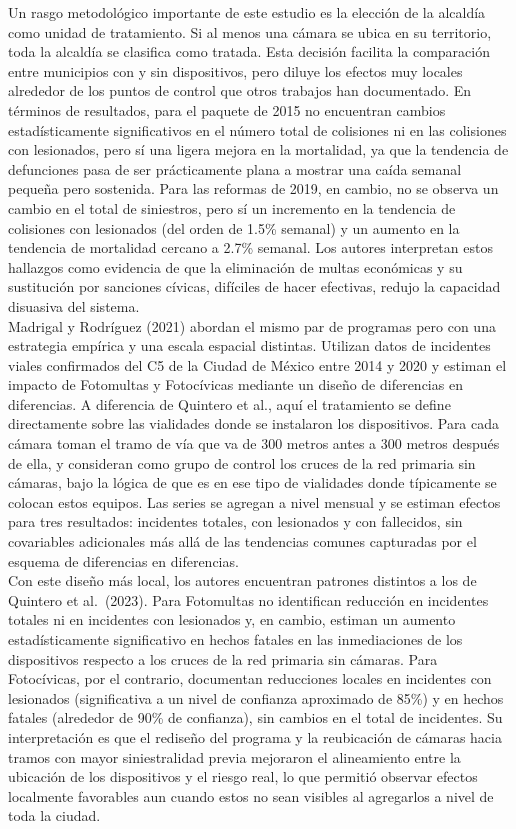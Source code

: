 Un rasgo metodológico importante de este estudio es la elección de la alcaldía como unidad de tratamiento. Si al menos una cámara se ubica en su territorio, toda la alcaldía se clasifica como tratada. Esta decisión facilita la comparación entre municipios con y sin dispositivos, pero diluye los efectos muy locales alrededor de los puntos de control que otros trabajos han documentado. En términos de resultados, para el paquete de 2015 no encuentran cambios estadísticamente significativos en el número total de colisiones ni en las colisiones con lesionados, pero sí una ligera mejora en la mortalidad, ya que la tendencia de defunciones pasa de ser prácticamente plana a mostrar una caída semanal pequeña pero sostenida. Para las reformas de 2019, en cambio, no se observa un cambio en el total de siniestros, pero sí un incremento en la tendencia de colisiones con lesionados (del orden de 1.5\% semanal) y un aumento en la tendencia de mortalidad cercano a 2.7\% semanal. Los autores interpretan estos hallazgos como evidencia de que la eliminación de multas económicas y su sustitución por sanciones cívicas, difíciles de hacer efectivas, redujo la capacidad disuasiva del sistema.\\

Madrigal y Rodríguez (2021) abordan el mismo par de programas pero con una estrategia empírica y una escala espacial distintas. Utilizan datos de incidentes viales confirmados del C5 de la Ciudad de México entre 2014 y 2020 y estiman el impacto de Fotomultas y Fotocívicas mediante un diseño de diferencias en diferencias. A diferencia de Quintero et al., aquí el tratamiento se define directamente sobre las vialidades donde se instalaron los dispositivos. Para cada cámara toman el tramo de vía que va de 300 metros antes a 300 metros después de ella, y consideran como grupo de control los cruces de la red primaria sin cámaras, bajo la lógica de que es en ese tipo de vialidades donde típicamente se colocan estos equipos. Las series se agregan a nivel mensual y se estiman efectos para tres resultados: incidentes totales, con lesionados y con fallecidos, sin covariables adicionales más allá de las tendencias comunes capturadas por el esquema de diferencias en diferencias.\\

Con este diseño más local, los autores encuentran patrones distintos a los de Quintero et al.\ (2023). Para Fotomultas no identifican reducción en incidentes totales ni en incidentes con lesionados y, en cambio, estiman un aumento estadísticamente significativo en hechos fatales en las inmediaciones de los dispositivos respecto a los cruces de la red primaria sin cámaras. Para Fotocívicas, por el contrario, documentan reducciones locales en incidentes con lesionados (significativa a un nivel de confianza aproximado de 85\%) y en hechos fatales (alrededor de 90\% de confianza), sin cambios en el total de incidentes. Su interpretación es que el rediseño del programa y la reubicación de cámaras hacia tramos con mayor siniestralidad previa mejoraron el alineamiento entre la ubicación de los dispositivos y el riesgo real, lo que permitió observar efectos localmente favorables aun cuando estos no sean visibles al agregarlos a nivel de toda la ciudad.\\

